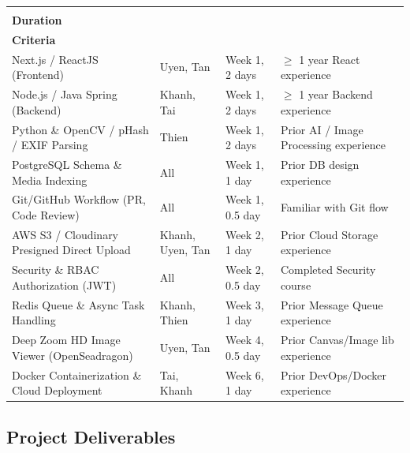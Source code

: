 \renewcommand{\arraystretch}{1.1}
\setlength{\tabcolsep}{6pt}
\begin{longtable}{|>{\raggedright\arraybackslash}p{}|>{\raggedright\arraybackslash}p{}|>{\raggedright\arraybackslash}p{}|>{\raggedright\arraybackslash}p{}|}
\hline
\multicolumn{1}{|c|}{\textbf{Training Area}} & \multicolumn{1}{c|}{\textbf{Participants}} & \multicolumn{1}{c|}{\begin{tabular}[c]{@{}c@{}}\textbf{When,}\\\textbf{Duration}\end{tabular}} & \multicolumn{1}{c|}{\begin{tabular}[c]{@{}c@{}}\textbf{Waiver}\\\textbf{Criteria}\end{tabular}} \\
\hline
Next.js / ReactJS (Frontend) & Uyen, Tan & Week 1, 2 days & $\geq$ 1 year React experience \\
\hline
Node.js / Java Spring (Backend) & Khanh, Tai & Week 1, 2 days & $\geq$ 1 year Backend experience \\
\hline
Python \& OpenCV / pHash / EXIF Parsing & Thien & Week 1, 2 days & Prior AI / Image Processing experience \\
\hline
PostgreSQL Schema \& Media Indexing & All & Week 1, 1 day & Prior DB design experience \\
\hline
Git/GitHub Workflow (PR, Code Review) & All & Week 1, 0.5 day & Familiar with Git flow \\
\hline
AWS S3 / Cloudinary Presigned Direct Upload & Khanh, Uyen, Tan & Week 2, 1 day & Prior Cloud Storage experience \\
\hline
Security \& RBAC Authorization (JWT) & All & Week 2, 0.5 day & Completed Security course \\
\hline
Redis Queue \& Async Task Handling & Khanh, Thien & Week 3, 1 day & Prior Message Queue experience \\
\hline
Deep Zoom HD Image Viewer (OpenSeadragon) & Uyen, Tan & Week 4, 0.5 day & Prior Canvas/Image lib experience \\
\hline
Docker Containerization \& Cloud Deployment & Tai, Khanh & Week 6, 1 day & Prior DevOps/Docker experience \\
\hline
\end{longtable}

\subsection{Project Deliverables}
\label{subsec:ii_project_deliverables}


